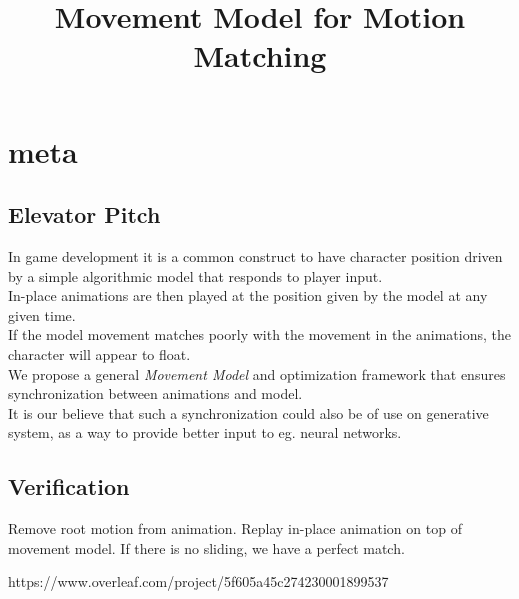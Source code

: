 \documentclass[format=acmtog]{acmart}
\begin{document}
\title{Movement Model for Motion Matching}









\maketitle

\section{meta}
\subsection{Elevator Pitch}
In game development it is a common construct to have character position driven by a simple algorithmic model that responds to player input.
\\ 
In-place animations are then played at the position given by the model at any given time.
\\
If the model movement matches poorly with the movement in the animations, the character will appear to float.
\\
We propose a general \textit{Movement Model} and optimization framework that ensures synchronization between animations and model. 
\\
It is our believe that such a synchronization could also be of use on generative system, as a way to provide better input to eg. neural networks.

\subsection{Verification}
Remove root motion from animation. Replay in-place animation on top of movement model. If there is no sliding, we have a perfect match.








https://www.overleaf.com/project/5f605a45c274230001899537





{}

\end{document}
